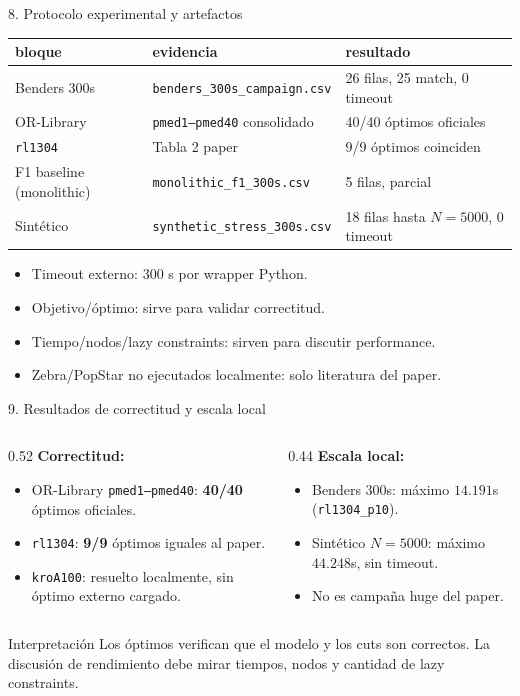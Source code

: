 \documentclass[10pt,aspectratio=169]{beamer}
\begin{document}
\begin{frame}{8. Protocolo experimental y artefactos}
\small
\begin{tabular}{lll}
\toprule
bloque & evidencia & resultado \\
\midrule
Benders 300s & \texttt{benders\_300s\_campaign.csv} & 26 filas, 25 match, 0 timeout \\
OR-Library & \texttt{pmed1--pmed40} consolidado & 40/40 óptimos oficiales \\
\texttt{rl1304} & Tabla 2 paper & 9/9 óptimos coinciden \\
F1 baseline (monolithic) & \texttt{monolithic\_f1\_300s.csv} & 5 filas, parcial \\
Sintético & \texttt{synthetic\_stress\_300s.csv} & 18 filas hasta $N=5000$, 0 timeout \\
\bottomrule
\end{tabular}
\vfill
\begin{itemize}
  \item Timeout externo: 300 s por wrapper Python.
  \item Objetivo/óptimo: sirve para validar correctitud.
  \item Tiempo/nodos/lazy constraints: sirven para discutir performance.
  \item Zebra/PopStar no ejecutados localmente: solo literatura del paper.
\end{itemize}
\end{frame}

\begin{frame}{9. Resultados de correctitud y escala local}
\begin{columns}
\begin{column}{0.52\textwidth}
\textbf{Correctitud:}
\begin{itemize}
  \item OR-Library \texttt{pmed1--pmed40}: \textbf{40/40} óptimos oficiales.
  \item \texttt{rl1304}: \textbf{9/9} óptimos iguales al paper.
  \item \texttt{kroA100}: resuelto localmente, sin óptimo externo cargado.
\end{itemize}
\end{column}
\begin{column}{0.44\textwidth}
\textbf{Escala local:}
\begin{itemize}
  \item Benders 300s: máximo $14.191$s (\texttt{rl1304\_p10}).
  \item Sintético $N=5000$: máximo $44.248$s, sin timeout.
  \item No es campaña huge del paper.
\end{itemize}
\end{column}
\end{columns}
\vfill
\begin{block}{Interpretación}
Los óptimos verifican que el modelo y los cuts son correctos. La discusión de rendimiento debe mirar tiempos, nodos y cantidad de lazy constraints.
\end{block}
\end{frame}
\end{document}
